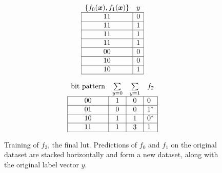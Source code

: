\begin{figure}[!htb]
\begin{minipage}{.95\linewidth}\centering
  \begin{minipage}[b]{.30\linewidth}\centering
    \begin{align*}
      \begin{array}{cc}
        \{f_0(\bm{x}),f_1(\bm{x})\}          & y          \\ \hline
        \multicolumn{1}{|c|}{11} & \multicolumn{1}{c|}{0} \\ \hline
        \multicolumn{1}{|c|}{11} & \multicolumn{1}{c|}{1} \\ \hline
        \multicolumn{1}{|c|}{11} & \multicolumn{1}{c|}{1} \\ \hline
        \multicolumn{1}{|c|}{11} & \multicolumn{1}{c|}{1} \\ \hline
        \multicolumn{1}{|c|}{00} & \multicolumn{1}{c|}{0} \\ \hline
        \multicolumn{1}{|c|}{10} & \multicolumn{1}{c|}{0} \\ \hline
        \multicolumn{1}{|c|}{10} & \multicolumn{1}{c|}{1} \\ \hline
      \end{array}
    \end{align*}
  \end{minipage}
  \begin{minipage}[b]{.4\linewidth}\centering
    \begin{align*}
      \begin{array}{cccc}
          \text{bit pattern}        & \sum\limits_{y=0}      & \multicolumn{1}{l}{\sum\limits_{y=1}} & f_2  \\ \hline
        \multicolumn{1}{|c|}{00} & \multicolumn{1}{c|}{1} & \multicolumn{1}{c|}{0} & \multicolumn{1}{l|}{0} \\ \hline
        \multicolumn{1}{|c|}{01} & \multicolumn{1}{c|}{0} & \multicolumn{1}{c|}{0} & \multicolumn{1}{l|}{1^*} \\ \hline
        \multicolumn{1}{|c|}{10} & \multicolumn{1}{c|}{1} & \multicolumn{1}{c|}{1} & \multicolumn{1}{l|}{0^*} \\ \hline
        \multicolumn{1}{|c|}{11} & \multicolumn{1}{c|}{1} & \multicolumn{1}{c|}{3} & \multicolumn{1}{l|}{1} \\ \hline
      \end{array}
    \end{align*}
  \end{minipage}
\end{minipage}
  \normalfont
  \caption{Training of $f_2$, the final lut. Predictions of $f_0$ and $f_1$ on the original dataset are stacked horizontally and form a new dataset, along with the original label vector $y$.}
    \label{fig:ex2}
\end{figure}
\FloatBarrier

